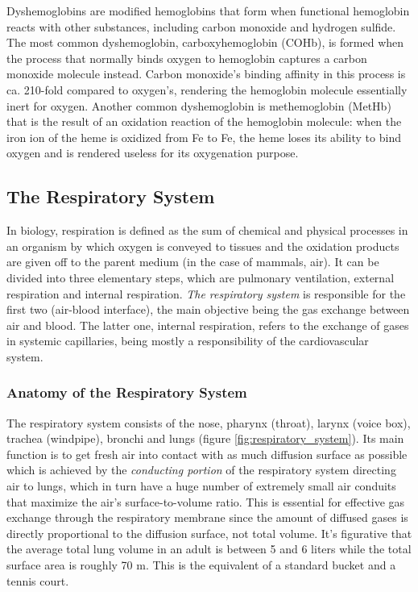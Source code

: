 Dyshemoglobins are modified hemoglobins that form when functional hemoglobin reacts with other substances, including carbon monoxide and hydrogen sulfide. The most common dyshemoglobin, carboxyhemoglobin (COHb), is formed when the process that normally binds oxygen to hemoglobin captures a carbon monoxide molecule instead. Carbon monoxide's binding affinity in this process is ca. 210-fold compared to oxygen's, rendering the hemoglobin molecule essentially inert for oxygen. Another common dyshemoglobin is methemoglobin (MetHb) that is the result of an oxidation reaction of the hemoglobin molecule: when the iron ion of the heme is oxidized from Fe to Fe, the heme loses its ability to bind oxygen and is rendered useless for its oxygenation purpose.\ \cite{Webster1997}

\subsection{The Respiratory System}

In biology, respiration is defined as the sum of chemical and physical processes in an organism by which oxygen is conveyed to tissues and the oxidation products are given off to the parent medium (in the case of mammals, air). It can be divided into three elementary steps, which are pulmonary ventilation, external respiration and internal respiration. \textit{The respiratory system} is responsible for the first two (air-blood interface), the main objective being the gas exchange between air and blood. The latter one, internal respiration, refers to the exchange of gases in systemic capillaries, being mostly a responsibility of the cardiovascular system.\ \cite{Tortora2000}

\subsubsection{Anatomy of the Respiratory System}

The respiratory system consists of the nose, pharynx (throat), larynx (voice box), trachea (windpipe), bronchi and lungs (figure \ref{fig:respiratory_system}). Its main function is to get fresh air into contact with as much diffusion surface as possible which is achieved by the \textit{conducting portion} of the respiratory system directing air to lungs, which in turn have a huge number of extremely small air conduits that maximize the air's surface-to-volume ratio. This is essential for effective gas exchange through the respiratory membrane since the amount of diffused gases is directly proportional to the diffusion surface, not total volume. It's figurative that the average total lung volume in an adult is between 5 and 6 liters while the total surface area is roughly 70 m. This is the equivalent of a standard bucket and a tennis court.\ \cite{Tortora2000}

